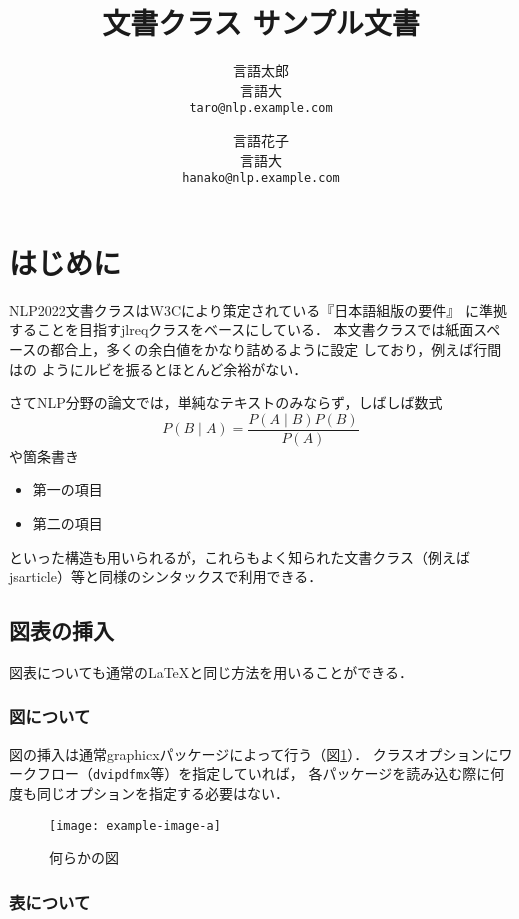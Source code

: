 \documentclass[
  platex, dvipdfmx,  %
]{nlp2022}
\title{\pkg{NLP2022}文書クラス サンプル文書}
\author{%
  言語太郎 \\ 言語大 \\ \texttt{taro@nlp.example.com}\and
  言語花子 \\ 言語大 \\ \texttt{hanako@nlp.example.com}}
\newcommand{\pkg}[1]{\textsf{#1}}
\newcommand{\code}[1]{\texttt{#1}}
\begin{document}
\maketitle

\section{はじめに}

\pkg{NLP2022}文書クラスはW3Cにより策定されている『日本語組版の要件』%
\cite{JLREQ}に準拠することを目指す\pkg{jlreq}クラスをベースにしている．
本文書クラスでは紙面スペースの都合上，多くの余白値をかなり詰めるように設定
しており，例えば行間はの
ようにルビを振るとほとんど余裕がない．

さてNLP分野の論文では，単純なテキストのみならず，しばしば数式
%
\begin{equation}
P(B\mid A) = \frac{P(A\mid B)P(B)}{P(A)}
\end{equation}
%
や箇条書き
%
\begin{itemize}
\item 第一の項目
\item 第二の項目
\end{itemize}
%
といった構造も用いられるが，これらもよく知られた文書クラス（例えば
\pkg{jsarticle}）等と同様のシンタックスで利用できる．

\subsection{図表の挿入}

図表についても通常の\LaTeX と同じ方法を用いることができる．

\subsubsection{図について}

図の挿入は通常\pkg{graphicx}パッケージによって行う（図\ref{fig:sample}）．
クラスオプションにワークフロー（\code{dvipdfmx}等）を指定していれば，
各パッケージを読み込む際に何度も同じオプションを指定する必要はない．
%
\begin{figure}[h]
\centering
\texttt{[image: example-image-a]}
\caption{何らかの図}
\label{fig:sample}
\end{figure}

\subsubsection{表について}
\end{document}
